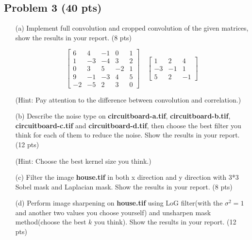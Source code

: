 \documentclass[11pt,letterpaper]{article}
\begin{document}
\subsection*{Problem 3 (40 pts)}

\begin{itemize}
    \item[(a)] Implement full convolution and cropped convolution of the given matrices, show the results in your report. (8 pts)
    
$$
 \begin{bmatrix}
6 & 4 & -1 & 0 & 1\\ 
1 & -3 & -4 & 3 & 2\\ 
0 & 3 & 5 & -2 & 1\\ 
9 & -1 & -3 & 4 & 5\\ 
-2 & -5 & 2 & 3 & 0
\end{bmatrix}\quad
\begin{bmatrix}
1 & 2 & 4\\ 
-3 & -1 & 1\\ 
5 & 2 & -1
\end{bmatrix}
$$

(\textcolor[rgb]{1,0,0}{Hint:} Pay attention to the difference between convolution and correlation.)

    \item[(b)] Describe the noise type on \textbf{circuitboard-a.tif}, \textbf{circuitboard-b.tif}, \textbf{circuitboard-c.tif} and \textbf{circuitboard-d.tif}, then choose the best filter you think for each of them to reduce the noise. Show the results in your report. (12 pts)

    (\textcolor[rgb]{1,0,0}{Hint:} Choose the best kernel size you think.)

    \item[(c)] Filter the image \textbf{house.tif} in both x direction and y direction with 3*3 Sobel mask and Laplacian mask. Show the results in your report. (8 pts)

    \item[(d)] Perform image sharpening on \textbf{house.tif} using LoG filter(with the $\sigma^2 = 1$ and another two values you choose yourself) and unsharpen mask method(choose the best $k$ you think). Show the results in your report. (12 pts)
\end{itemize}
\end{document}
